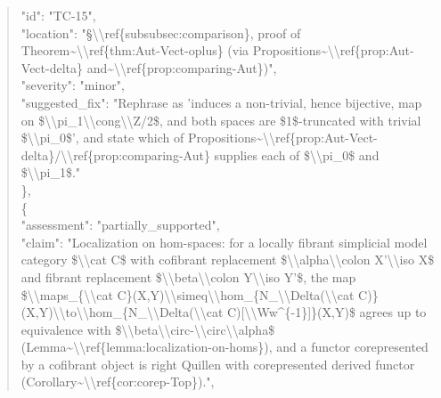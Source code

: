 \documentclass[11pt]{article}
\begin{document}
\begin{quote}
      "id": "TC-15",\\
      "location": "§\textbackslash{}\textbackslash{}ref\{subsubsec:comparison\}, proof of Theorem\~{}\textbackslash{}\textbackslash{}ref\{thm:Aut-Vect-oplus\} (via Propositions\~{}\textbackslash{}\textbackslash{}ref\{prop:Aut-Vect-delta\} and\~{}\textbackslash{}\textbackslash{}ref\{prop:comparing-Aut\})",\\
      "severity": "minor",\\
      "suggested\_fix": "Rephrase as 'induces a non-trivial, hence bijective, map on \$\textbackslash{}\textbackslash{}pi\_1\textbackslash{}\textbackslash{}cong\textbackslash{}\textbackslash{}Z/2\$, and both spaces are \$1\$-truncated with trivial \$\textbackslash{}\textbackslash{}pi\_0\$', and state which of Propositions\~{}\textbackslash{}\textbackslash{}ref\{prop:Aut-Vect-delta\}/\textbackslash{}\textbackslash{}ref\{prop:comparing-Aut\} supplies each of \$\textbackslash{}\textbackslash{}pi\_0\$ and \$\textbackslash{}\textbackslash{}pi\_1\$."\\
    \},\\
    \{\\
      "assessment": "partially\_supported",\\
      "claim": "Localization on hom-spaces: for a locally fibrant simplicial model category \$\textbackslash{}\textbackslash{}cat C\$ with cofibrant replacement \$\textbackslash{}\textbackslash{}alpha\textbackslash{}\textbackslash{}colon X'\textbackslash{}\textbackslash{}iso X\$ and fibrant replacement \$\textbackslash{}\textbackslash{}beta\textbackslash{}\textbackslash{}colon Y\textbackslash{}\textbackslash{}iso Y'\$, the map \$\textbackslash{}\textbackslash{}maps\_\{\textbackslash{}\textbackslash{}cat C\}(X,Y)\textbackslash{}\textbackslash{}simeq\textbackslash{}\textbackslash{}hom\_\{N\_\textbackslash{}\textbackslash{}Delta(\textbackslash{}\textbackslash{}cat C)\}(X,Y)\textbackslash{}\textbackslash{}to\textbackslash{}\textbackslash{}hom\_\{N\_\textbackslash{}\textbackslash{}Delta(\textbackslash{}\textbackslash{}cat C)[\textbackslash{}\textbackslash{}Ww\^{}\{-1\}]\}(X,Y)\$ agrees up to equivalence with \$\textbackslash{}\textbackslash{}beta\textbackslash{}\textbackslash{}circ-\textbackslash{}\textbackslash{}circ\textbackslash{}\textbackslash{}alpha\$ (Lemma\~{}\textbackslash{}\textbackslash{}ref\{lemma:localization-on-homs\}), and a functor corepresented by a cofibrant object is right Quillen with corepresented derived functor (Corollary\~{}\textbackslash{}\textbackslash{}ref\{cor:corep-Top\}).",\\

\end{quote}
\end{document}
